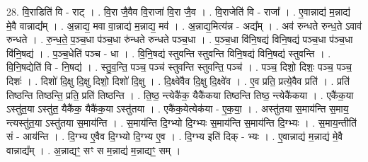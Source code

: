 \documentclass[17pt]{extarticle}
\begin{document}
28. वि॒राडिति॑ वि - राट् । . वि॒रा जै॒वैव वि॒राजा॑ वि॒रा जै॒व । . वि॒राजेति॑ वि - राजा᳚ । . ए॒वान्नाद्य॑ म॒न्नाद्य॑ मे॒वै वान्नाद्य᳚म् । . अ॒न्नाद्य॒ मवा वा॒न्नाद्य॑ म॒न्नाद्य॒ मव॑ । . अ॒न्नाद्य॒मित्य॑न्न - अद्य᳚म् । . अव॑ रुन्धते रुन्ध॒ते ऽवाव॑ रुन्धते । . रु॒न्ध॒ते॒ प॒ञ्च॒धा प॑ञ्च॒धा रु॑न्धते रुन्धते पञ्च॒धा । . प॒ञ्च॒धा वि॑नि॒षद्य॑ विनि॒षद्य॑ पञ्च॒धा प॑ञ्च॒धा वि॑नि॒षद्य॑ । . प॒ञ्च॒धेति॑ पञ्च - धा । . वि॒नि॒षद्य॑ स्तुवन्ति स्तुवन्ति विनि॒षद्य॑ विनि॒षद्य॑ स्तुवन्ति । . वि॒नि॒षद्येति॑ वि - नि॒षद्य॑ । . स्तु॒व॒न्ति॒ पञ्च॒ पञ्च॑ स्तुवन्ति स्तुवन्ति॒ पञ्च॑ । . पञ्च॒ दिशो॒ दिशः॒ पञ्च॒ पञ्च॒ दिशः॑ । . दिशो॑ दि॒क्षु दि॒क्षु दिशो॒ दिशो॑ दि॒क्षु । . दि॒क्ष्वे॑वैव दि॒क्षु दि॒क्ष्वे॑व । . ए॒व प्रति॒ प्रत्ये॒वैव प्रति॑ । . प्रति॑ तिष्ठन्ति तिष्ठन्ति॒ प्रति॒ प्रति॑ तिष्ठन्ति । . ति॒ष्ठ॒ न्त्येकै॑क॒ यैकै॑कया तिष्ठन्ति तिष्ठ॒ न्त्येकै॑कया । . एकै॑क॒या ऽस्तु॑त॒या ऽस्तु॑त॒ यैकै॑क॒ यैकै॑क॒या ऽस्तु॑तया । . एकै॑क॒येत्येक॑या - ए॒क॒या॒ । . अस्तु॑तया स॒माय॑न्ति स॒माय॒ न्त्यस्तु॑त॒या ऽस्तु॑तया स॒माय॑न्ति । . स॒माय॑न्ति दि॒ग्भ्यो दि॒ग्भ्यः स॒माय॑न्ति स॒माय॑न्ति दि॒ग्भ्यः । . स॒माय॒न्तीति॑ सं - आय॑न्ति । . दि॒ग्भ्य ए॒वैव दि॒ग्भ्यो दि॒ग्भ्य ए॒व । . दि॒ग्भ्य इति॑ दिक् - भ्यः । . ए॒वान्नाद्य॑ म॒न्नाद्य॑ मे॒वै वान्नाद्य᳚म् । . अ॒न्नाद्यꣳ॒॒ सꣳ स म॒न्नाद्य॑ म॒न्नाद्यꣳ॒॒ सम् । \newline
\end{document}

